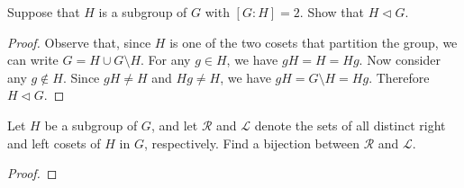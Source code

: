 \documentclass[10pt]{amsart}
\begin{document}
\begin{thm}
  Suppose that $H$ is a subgroup of $G$ with $[G : H] = 2$.  Show that $H \lhd G$.
  \begin{proof}
    Observe that, since $H$ is one of the two cosets that partition the group, we can write $G = H \cup G \setminus H$.  
    For any $g \in H$, we have $gH = H = Hg$.
    Now consider any $g \not \in H$.
    Since $gH \not = H$ and $Hg \not = H$, we have $gH = G \setminus H = Hg.$ 
    Therefore $H \lhd G$.
  \end{proof}
\end{thm}

\begin{thm}
  Let $H$ be a subgroup of $G$, and let $\mathcal{R}$ and $\mathcal{L}$ denote the sets of all distinct right and left cosets of $H$ in $G$, respectively. 
  Find a bijection between $\mathcal{R}$ and $\mathcal{L}$.
  \begin{proof}
    
  \end{proof}
\end{thm}
\end{document}
